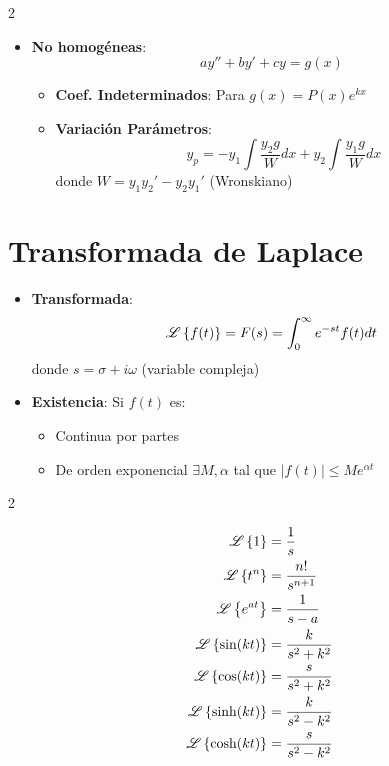 \documentclass{article}
\begin{document}
\begin{multicols}{2}
\begin{itemize}[leftmargin=*,noitemsep,topsep=0pt]
        \item \textbf{No homogéneas}:
          $$ay'' + by' + cy = g(x)$$
          \begin{itemize}[leftmargin=*,noitemsep,topsep=0pt]
            \item \textbf{Coef. Indeterminados}: Para $g(x) = P(x)e^{kx}$
            \item \textbf{Variación Parámetros}:
              $$y_p = -y_1\int \dfrac{y_2 g}{W}dx + y_2\int \dfrac{y_1 g}{W}dx$$
              donde $W = y_1y_2' - y_2y_1'$ (Wronskiano)
          \end{itemize}
      \end{itemize}

      \columnbreak
      \section{Transformada de Laplace}
      \begin{itemize}[leftmargin=*,noitemsep,topsep=0pt]

        \item \textbf{Transformada}:
          $$\mathscr{L}\left\{f(t)\right\} = F(s) = \int_0^\infty e^{-st}f(t)dt$$
          donde $s = \sigma + i\omega$ (variable compleja)

        \item \textbf{Existencia}: Si $f(t)$ es:
          \begin{itemize}[leftmargin=*,noitemsep,topsep=0pt]
            \item Continua por partes
            \item De orden exponencial $\exists M,\alpha$ tal que $|f(t)| \leq Me^{\alpha t}$
          \end{itemize}
      \end{itemize}

      \begin{multicols}{2}

        $$
        \begin{aligned}
          \mathscr{L}\left\{1\right\} &= \dfrac{1}{s}\\
          \mathscr{L}\left\{t^n\right\} &= \dfrac{n!}{s^{n+1}}\\
          \mathscr{L}\left\{e^{at}\right\} &= \dfrac{1}{s - a}\\
          \mathscr{L}\left\{\sin(kt)\right\} &= \dfrac{k}{s^2 + k^2}\\
          \mathscr{L}\left\{\cos(kt)\right\} &= \dfrac{s}{s^2 + k^2}\\
          \mathscr{L}\left\{\sinh(kt)\right\} &= \dfrac{k}{s^2 - k^2}\\
          \mathscr{L}\left\{\cosh(kt)\right\} &= \dfrac{s}{s^2 - k^2}\\
        \end{aligned}
        $$


\end{multicols}
\end{multicols}
\end{document}
